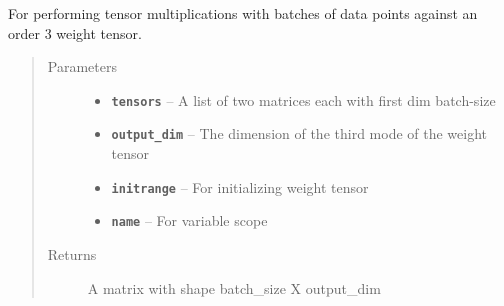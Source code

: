 \documentclass[letterpaper,10pt,english]{sphinxmanual}
\begin{document}

\begin{fulllineitems}
\label{node_ops:node_ops.binary_tensor_combine}
For performing tensor multiplications with batches of data points against an order 3
weight tensor.
\begin{quote}\begin{description}
\item[{Parameters}] \leavevmode\begin{itemize}
\item {} 
\textbf{\texttt{tensors}} -- A list of two matrices each with first dim batch-size

\item {} 
\textbf{\texttt{output\_dim}} -- The dimension of the third mode of the weight tensor

\item {} 
\textbf{\texttt{initrange}} -- For initializing weight tensor

\item {} 
\textbf{\texttt{name}} -- For variable scope

\end{itemize}

\item[{Returns}] \leavevmode
A matrix with shape batch\_size X output\_dim

\end{description}\end{quote}

\end{fulllineitems}


\begin{fulllineitems}
\label{node_ops:node_ops.binary_tensor_combine2}
\end{fulllineitems}

\end{document}
